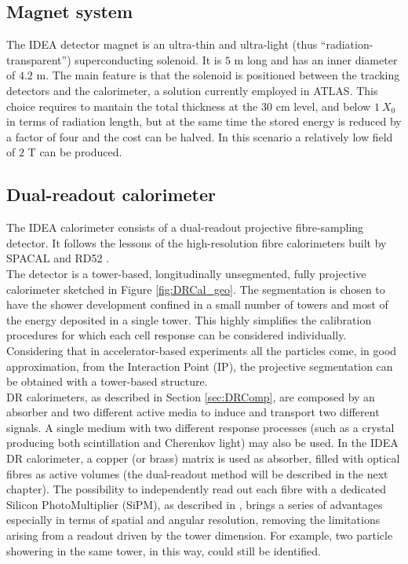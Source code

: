 \subsection{Magnet system}
The IDEA detector magnet is an ultra-thin and ultra-light (thus “radiation-transparent”) superconducting solenoid. It is $5$ m long and has an inner diameter of $4.2$ m. The main feature is that the solenoid is positioned between the tracking detectors and the calorimeter, a solution currently employed in ATLAS.
This choice requires to mantain the total thickness at the $30$ cm level, and below $1\ X_0$ in terms of radiation length, but at the same time the stored energy is reduced by a factor of four and the cost can be halved.
In this scenario a relatively low field of $2$ T can be produced.

\subsection{Dual-readout calorimeter}
The IDEA calorimeter consists of a dual-readout projective fibre-sampling detector. It follows the lessons of the high-resolution fibre calorimeters built by SPACAL \cite{SPACAL} and RD52 \cite{RD52}.\\
The detector is a tower-based, longitudinally unsegmented, fully projective calorimeter sketched in Figure \ref{fig:DRCal_geo}.
The segmentation is chosen to have the shower development confined in a small number of towers and most of the energy deposited in a single tower.
This highly simplifies the calibration procedures for which each cell response can be considered individually.
Considering that in accelerator-based experiments all the particles come, in good approximation, from the Interaction Point (IP), the projective segmentation can be obtained with a tower-based structure.\\

DR calorimeters, as described in Section \ref{sec:DRComp}, are composed by an absorber and two different active media to induce and transport two different signals. A single medium with two different response processes (such as a crystal producing both scintillation and Cherenkov light) may also be used.
In the IDEA DR calorimeter, a copper (or brass) matrix is used as absorber, filled with optical fibres as active volumes (the dual-readout method will be described in the next chapter).
The possibility to independently read out each fibre with a dedicated Silicon PhotoMultiplier (SiPM), as described in \cite{Massi_tesi}, brings a series of advantages especially in terms of spatial and angular resolution, removing the limitations arising from a readout driven by the tower dimension. For example, two particle showering in the same tower, in this way, could still be identified.\\

